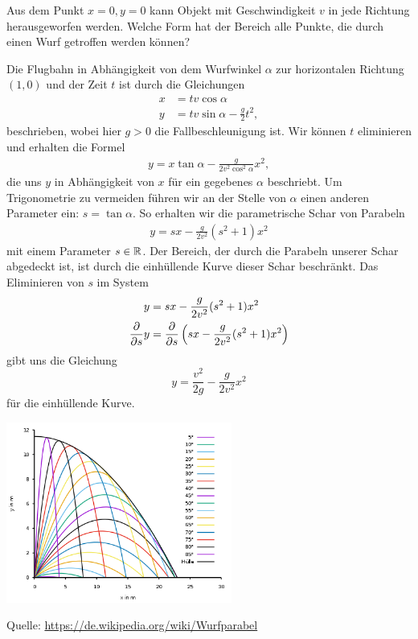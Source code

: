 \begin{bem} 
	Aus dem Punkt $x=0,y=0$ kann Objekt mit Geschwindigkeit $v$ in jede Richtung herausgeworfen werden. Welche Form hat der Bereich alle Punkte, die durch einen Wurf getroffen werden können? 
	
	Die Flugbahn in Abhängigkeit von dem Wurfwinkel $\alpha$ zur horizontalen Richtung $(1,0)$ und der Zeit $t$ ist durch die Gleichungen 
	\begin{align*}
		x & = t v \cos \alpha 
\\		y & = t v \sin \alpha  - \frac{g}{2} t^2,
	\end{align*}
	beschrieben, wobei hier $g>0$ die Fallbeschleunigung ist. Wir können $t$ eliminieren und erhalten die Formel
	\begin{align*}
		y = x \tan \alpha  - \frac{g}{2 v^2 \cos^2 \alpha} x^2,
	\end{align*} 
	die uns $y$ in Abhängigkeit von $x$ für ein gegebenes $\alpha$ beschriebt. Um Trigonometrie zu vermeiden führen wir an der Stelle von $\alpha$ 
	einen anderen Parameter  ein: $s = \tan \alpha$. So erhalten wir die parametrische Schar von Parabeln
	\begin{align*}
		y = s x - \frac{g}{2 v^2} (s^2 + 1) x^2
	\end{align*} 
	mit einem Parameter $s \in \mathbb{R}$. 
	Der Bereich, der durch die Parabeln unserer Schar abgedeckt ist, ist durch die einhüllende Kurve dieser Schar beschränkt. Das Eliminieren von $s$ im System
	\begin{align*}
		y & = s x - \frac{g}{2 v^2} (s^2 + 1) x^2
\\		\frac{\partial }{\partial s} y & = \frac{\partial }{\partial s} \left( s x - \frac{g}{2 v^2} (s^2 + 1) x^2 \right)
	\end{align*} 
	gibt uns die Gleichung 	
	\[
		y = \frac{v^2}{2 g} - \frac{g}{2 v^2} x^2
	\]
	für die einhüllende Kurve. 
	
	\begin{center}
	\includegraphics[width=20em]{pics/wurf.png}	
	\end{center}

	{\scriptsize Quelle: \url{https://de.wikipedia.org/wiki/Wurfparabel} } 
\end{bem} 

